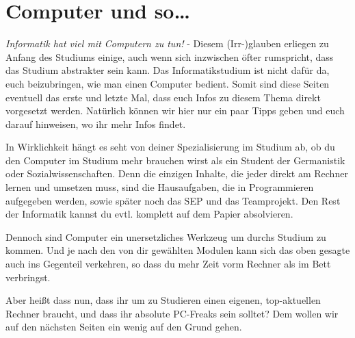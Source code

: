 \section{Computer und so\ldots}
	\label{computer}

\begin{multicols}{2}
	\emph{Informatik hat viel mit Computern zu tun!} - Diesem (Irr-)glauben erliegen zu Anfang des Studiums einige, auch wenn sich inzwischen öfter rumspricht, dass das Studium abstrakter sein kann. Das Informatikstudium ist nicht dafür da,  euch beizubringen, wie man einen Computer bedient. Somit sind diese Seiten eventuell das erste und letzte Mal,  dass euch Infos zu diesem Thema direkt vorgesetzt werden. Natürlich können wir hier nur ein paar Tipps geben und euch darauf hinweisen, wo ihr mehr Infos  findet.

	In Wirklichkeit hängt es seht von deiner Spezialisierung im Studium ab, ob  du den Computer im Studium mehr brauchen wirst als ein Student der Germanistik oder Sozialwissenschaften. Denn die einzigen Inhalte,  die jeder direkt am Rechner lernen und umsetzen muss, sind die Hausaufgaben,  die in Programmieren aufgegeben werden, sowie später noch das SEP und das Teamprojekt. Den Rest der Informatik kannst du evtl. komplett auf dem Papier absolvieren.

	Dennoch sind Computer ein unersetzliches Werkzeug um durchs Studium zu kommen. Und je nach den von dir gewählten Modulen kann sich das oben gesagte auch ins Gegenteil verkehren, so dass du mehr Zeit vorm Rechner als im Bett verbringst.

	Aber heißt dass nun, dass ihr um zu Studieren einen eigenen, top-aktuellen Rechner braucht, und dass ihr absolute PC-Freaks sein solltet? Dem wollen wir auf den nächsten Seiten ein wenig auf den Grund gehen.
\end{multicols}





